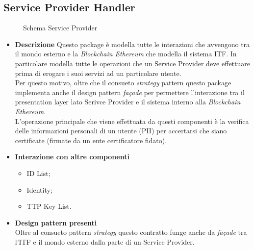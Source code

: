 \subsection{Service Provider Handler}
\begin{figure}[!h]
	\centering
	\caption{Schema Service Provider}
\end{figure}
\begin{itemize}
	\item \textbf{Descrizione}
	Questo package è modella tutte le interazioni che avvengono tra il mondo esterno e la \textit{Blockchain Ethereum} che modella il sistema \gls{ITF}. In particolare modella tutte le operazioni che un Service Provider deve effettuare prima di erogare i suoi servizi ad un particolare utente.\\
	Per questo motivo, oltre che il consueto \textit{strategy} pattern questo package implementa anche il design pattern \textit{façade} per permettere l'interazione tra il presentation layer lato Serivce Provider e il sistema interno alla \textit{Blockchain Ethereum}.\\
	L'operazione principale che viene effettuata da questi componenti è la verifica delle informazioni personali di un utente (\gls{PII}) per accertarsi che siano certificate (firmate da un ente certificatore fidato).
	\item \textbf{Interazione con altre componenti}
	\begin{itemize}
		\item ID List;
		\item Identity;
		\item TTP Key List.
	\end{itemize}
	\item \textbf{Design pattern presenti}\\
	Oltre al consueto pattern \textit{strategy} questo contratto funge anche da \textit{façade} tra l'\gls{ITF} e il mondo esterno dalla parte di un Service Provider.
\end{itemize}
